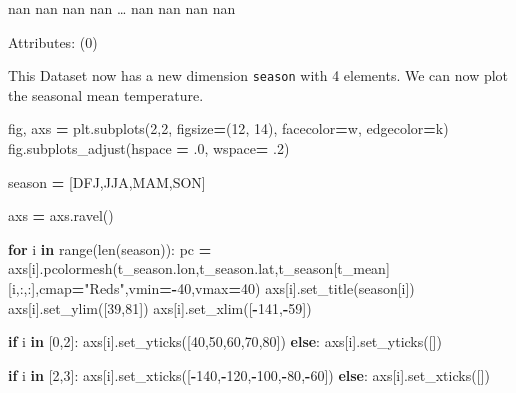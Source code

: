 \documentclass[
]{book}
\newenvironment{Shaded}{\begin{snugshade}}{\end{snugshade}}
\newcommand{\BuiltInTok}[1]{#1}
\newcommand{\ControlFlowTok}[1]{\textcolor[rgb]{0.13,0.29,0.53}{\textbf{#1}}}
\newcommand{\DecValTok}[1]{\textcolor[rgb]{0.00,0.00,0.81}{#1}}
\newcommand{\FloatTok}[1]{\textcolor[rgb]{0.00,0.00,0.81}{#1}}
\newcommand{\KeywordTok}[1]{\textcolor[rgb]{0.13,0.29,0.53}{\textbf{#1}}}
\newcommand{\NormalTok}[1]{#1}
\newcommand{\OperatorTok}[1]{\textcolor[rgb]{0.81,0.36,0.00}{\textbf{#1}}}
\newcommand{\StringTok}[1]{\textcolor[rgb]{0.31,0.60,0.02}{#1}}
\begin{document}
nan nan nan nan \ldots{} nan nan nan nan

Attributes: {(0)}

This Dataset now has a new dimension \texttt{season} with 4 elements. We can now plot the seasonal mean temperature.

\begin{Shaded}
\begin{Highlighting}[]
\NormalTok{fig, axs }\OperatorTok{=}\NormalTok{ plt.subplots(}\DecValTok{2}\NormalTok{,}\DecValTok{2}\NormalTok{, figsize}\OperatorTok{=}\NormalTok{(}\DecValTok{12}\NormalTok{, }\DecValTok{14}\NormalTok{), facecolor}\OperatorTok{=}\StringTok{\textquotesingle{}w\textquotesingle{}}\NormalTok{, edgecolor}\OperatorTok{=}\StringTok{\textquotesingle{}k\textquotesingle{}}\NormalTok{)}
\NormalTok{fig.subplots\_adjust(hspace }\OperatorTok{=} \FloatTok{.0}\NormalTok{, wspace}\OperatorTok{=} \FloatTok{.2}\NormalTok{)}

\NormalTok{season }\OperatorTok{=}\NormalTok{ [}\StringTok{\textquotesingle{}DFJ\textquotesingle{}}\NormalTok{,}\StringTok{\textquotesingle{}JJA\textquotesingle{}}\NormalTok{,}\StringTok{\textquotesingle{}MAM\textquotesingle{}}\NormalTok{,}\StringTok{\textquotesingle{}SON\textquotesingle{}}\NormalTok{]}

\NormalTok{axs }\OperatorTok{=}\NormalTok{ axs.ravel()}

\ControlFlowTok{for}\NormalTok{ i }\KeywordTok{in} \BuiltInTok{range}\NormalTok{(}\BuiltInTok{len}\NormalTok{(season)):}
\NormalTok{    pc }\OperatorTok{=}\NormalTok{ axs[i].pcolormesh(t\_season.lon,t\_season.lat,t\_season[}\StringTok{\textquotesingle{}t\_mean\textquotesingle{}}\NormalTok{][i,:,:],cmap}\OperatorTok{=}\StringTok{"Reds"}\NormalTok{,vmin}\OperatorTok{={-}}\DecValTok{40}\NormalTok{,vmax}\OperatorTok{=}\DecValTok{40}\NormalTok{)}
\NormalTok{    axs[i].set\_title(season[i])}
\NormalTok{    axs[i].set\_ylim([}\DecValTok{39}\NormalTok{,}\DecValTok{81}\NormalTok{])}
\NormalTok{    axs[i].set\_xlim([}\OperatorTok{{-}}\DecValTok{141}\NormalTok{,}\OperatorTok{{-}}\DecValTok{59}\NormalTok{])}

    \ControlFlowTok{if}\NormalTok{ i }\KeywordTok{in}\NormalTok{ [}\DecValTok{0}\NormalTok{,}\DecValTok{2}\NormalTok{]:}
\NormalTok{        axs[i].set\_yticks([}\DecValTok{40}\NormalTok{,}\DecValTok{50}\NormalTok{,}\DecValTok{60}\NormalTok{,}\DecValTok{70}\NormalTok{,}\DecValTok{80}\NormalTok{])}
    \ControlFlowTok{else}\NormalTok{:}
\NormalTok{        axs[i].set\_yticks([])}

    \ControlFlowTok{if}\NormalTok{ i }\KeywordTok{in}\NormalTok{ [}\DecValTok{2}\NormalTok{,}\DecValTok{3}\NormalTok{]:}
\NormalTok{        axs[i].set\_xticks([}\OperatorTok{{-}}\DecValTok{140}\NormalTok{,}\OperatorTok{{-}}\DecValTok{120}\NormalTok{,}\OperatorTok{{-}}\DecValTok{100}\NormalTok{,}\OperatorTok{{-}}\DecValTok{80}\NormalTok{,}\OperatorTok{{-}}\DecValTok{60}\NormalTok{])}
    \ControlFlowTok{else}\NormalTok{:}
\NormalTok{        axs[i].set\_xticks([])                }


\end{Highlighting}
\end{Shaded}
\end{document}
